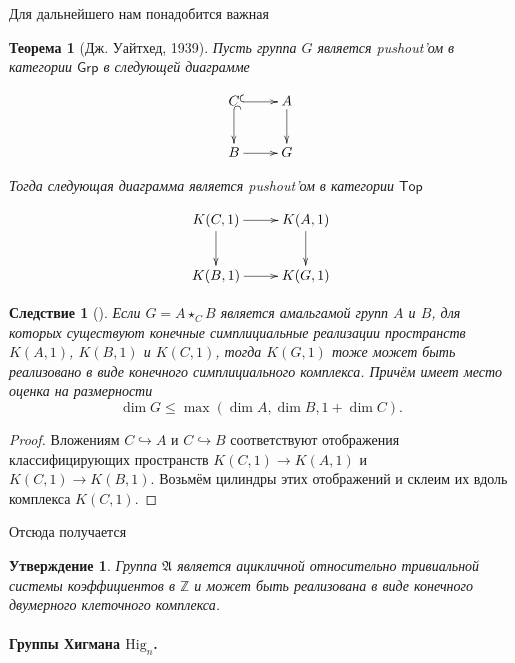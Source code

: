 \documentclass[14pt, dvipsnames]{extarticle}
\newtheorem{theorem}{Теорема}
\newtheorem{statement}{Утверждение}
\newtheorem{corollary}{Следствие}[theorem]
\theoremstyle{definition}
\theoremstyle{remark}
\begin{document}
Для дальнейшего нам понадобится важная

\begin{theorem}[Дж. Уайтхед, 1939]\label{Whitehead}
Пусть группа $G$ является pushout'ом в категории $\mathsf{Grp}$ в следующей диаграмме 

$$\xymatrix{
    C \ar@{^{(}->}[r] \ar@{^{(}->}[d] & A \ar[d] \\
    B \ar[r]       & G }$$ 
    
Тогда следующая диаграмма является pushout'ом в категории $\mathsf{Top}$ 

$$\xymatrix{
    K(C, 1) \ar[r] \ar[d] & K(A, 1) \ar[d] \\
    K(B, 1) \ar[r]       & K(G, 1) }$$ 
    
\end{theorem}

\begin{corollary}[\cite{BDH}]\label{finite}
Если $G=A\star_C B$ является амальгамой групп $A$ и $B$, для которых существуют конечные симплициальные реализации пространств $K(A, 1)$, $K(B, 1)$ и $K(C, 1)$, тогда $K(G, 1)$ тоже может быть реализовано в виде конечного симплициального комплекса. Причём имеет место оценка на размерности $$\dim G\leqslant \max(\dim A, \dim B, 1+\dim C).$$
\end{corollary} 

\begin{proof}

Вложениям $C\hookrightarrow A$ и $C\hookrightarrow B$ соответствуют отображения классифицирующих пространств $K(C, 1)\to K(A, 1)$ и $K(C, 1)\to K(B, 1)$. Возьмём цилиндры этих отображений и склеим их вдоль комплекса $K(C, 1)$.
\end{proof}

Отсюда получается  

\begin{statement}
Группа $\mathfrak{A}$ является ацикличной относительно тривиальной системы коэффициентов в $\mathbb{Z}$ и может быть реализована в виде конечного двумерного клеточного комплекса.
\end{statement}











\paragraph{Группы Хигмана $\mathrm{Hig}_n$.}
\end{document}

